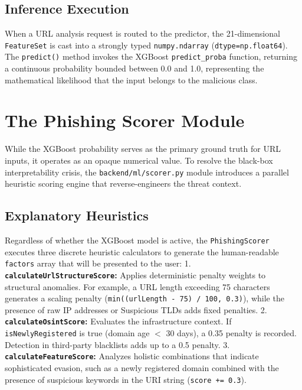 \subsection{Inference Execution}\label{inference-execution}

When a URL analysis request is routed to the predictor, the
21-dimensional \texttt{FeatureSet} is cast into a strongly typed
\texttt{numpy.ndarray} (\texttt{dtype=np.float64}). The
\texttt{predict()} method invokes the XGBoost \texttt{predict\_proba}
function, returning a continuous probability bounded between 0.0 and
1.0, representing the mathematical likelihood that the input belongs to
the malicious class.

\section{The Phishing Scorer
Module}\label{the-phishing-scorer-module}

While the XGBoost probability serves as the primary ground truth for URL
inputs, it operates as an opaque numerical value. To resolve the
black-box interpretability crisis, the \texttt{backend/ml/scorer.py}
module introduces a parallel heuristic scoring engine that
reverse-engineers the threat context.

\subsection{Explanatory Heuristics}\label{explanatory-heuristics}

Regardless of whether the XGBoost model is active, the
\texttt{PhishingScorer} executes three discrete heuristic calculators to
generate the human-readable \texttt{factors} array that will be
presented to the user: 1. \textbf{\texttt{calculateUrlStructureScore}:}
Applies deterministic penalty weights to structural anomalies. For
example, a URL length exceeding 75 characters generates a scaling
penalty (\texttt{min((urlLength\ -\ 75)\ /\ 100,\ 0.3)}), while the
presence of raw IP addresses or Suspicious TLDs adds fixed penalties. 2.
\textbf{\texttt{calculateOsintScore}:} Evaluates the infrastructure
context. If \texttt{isNewlyRegistered} is true (domain age $<${}
30 days), a 0.35 penalty is recorded. Detection in third-party
blacklists adds up to a 0.5 penalty. 3.
\textbf{\texttt{calculateFeatureScore}:} Analyzes holistic combinations
that indicate sophisticated evasion, such as a newly registered domain
combined with the presence of suspicious keywords in the URI string
(\texttt{score\ +=\ 0.3}).

